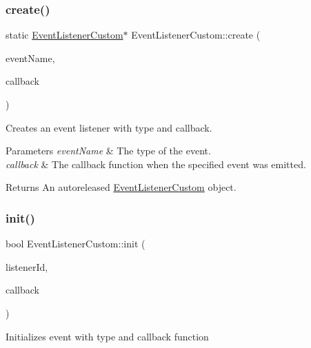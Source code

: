 \subsubsection{\texorpdfstring{create()}{create()}\hspace{0.1cm}{\footnotesize\ttfamily [2/2]}}
{\footnotesize\ttfamily static \hyperlink{classEventListenerCustom}{Event\+Listener\+Custom}$\ast$ Event\+Listener\+Custom\+::create (\begin{DoxyParamCaption}\item[{const std\+::string \&}]{event\+Name,  }\item[{const std\+::function$<$ void(\hyperlink{classEventCustom}{Event\+Custom} $\ast$)$>$ \&}]{callback }\end{DoxyParamCaption})\hspace{0.3cm}{\ttfamily [static]}}

Creates an event listener with type and callback. 
\begin{DoxyParams}{Parameters}
{\em event\+Name} & The type of the event. \\
\hline
{\em callback} & The callback function when the specified event was emitted. \\
\hline
\end{DoxyParams}
\begin{DoxyReturn}{Returns}
An autoreleased \hyperlink{classEventListenerCustom}{Event\+Listener\+Custom} object. 
\end{DoxyReturn}
\mbox{\label{classEventListenerCustom_ae29940d9da89b7e8f50d4766c638b40f}} 
\subsubsection{\texorpdfstring{init()}{init()}\hspace{0.1cm}{\footnotesize\ttfamily [1/2]}}
{\footnotesize\ttfamily bool Event\+Listener\+Custom\+::init (\begin{DoxyParamCaption}\item[{const Listener\+ID \&}]{listener\+Id,  }\item[{const std\+::function$<$ void(\hyperlink{classEventCustom}{Event\+Custom} $\ast$)$>$ \&}]{callback }\end{DoxyParamCaption})}

Initializes event with type and callback function \mbox{\label{classEventListenerCustom_ae29940d9da89b7e8f50d4766c638b40f}} 
